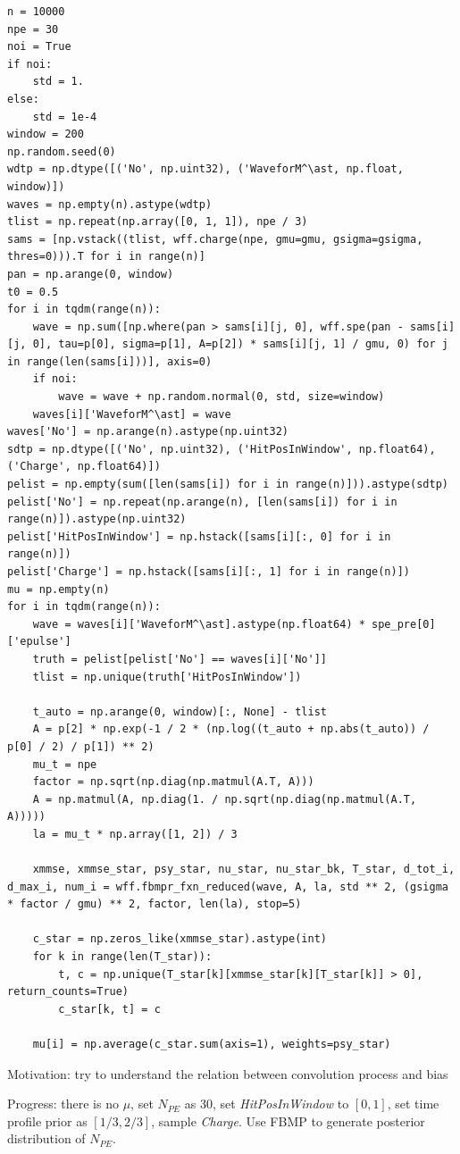 \documentclass[notitlepage]{article}
\begin{document}
\begin{lstlisting}
n = 10000
npe = 30
noi = True
if noi:
    std = 1.
else:
    std = 1e-4
window = 200
np.random.seed(0)
wdtp = np.dtype([('No', np.uint32), ('WaveforM^\ast, np.float, window)])
waves = np.empty(n).astype(wdtp)
tlist = np.repeat(np.array([0, 1, 1]), npe / 3)
sams = [np.vstack((tlist, wff.charge(npe, gmu=gmu, gsigma=gsigma, thres=0))).T for i in range(n)]
pan = np.arange(0, window)
t0 = 0.5
for i in tqdm(range(n)):
    wave = np.sum([np.where(pan > sams[i][j, 0], wff.spe(pan - sams[i][j, 0], tau=p[0], sigma=p[1], A=p[2]) * sams[i][j, 1] / gmu, 0) for j in range(len(sams[i]))], axis=0)
    if noi:
        wave = wave + np.random.normal(0, std, size=window)
    waves[i]['WaveforM^\ast] = wave
waves['No'] = np.arange(n).astype(np.uint32)
sdtp = np.dtype([('No', np.uint32), ('HitPosInWindow', np.float64), ('Charge', np.float64)])
pelist = np.empty(sum([len(sams[i]) for i in range(n)])).astype(sdtp)
pelist['No'] = np.repeat(np.arange(n), [len(sams[i]) for i in range(n)]).astype(np.uint32)
pelist['HitPosInWindow'] = np.hstack([sams[i][:, 0] for i in range(n)])
pelist['Charge'] = np.hstack([sams[i][:, 1] for i in range(n)])
mu = np.empty(n)
for i in tqdm(range(n)):
    wave = waves[i]['WaveforM^\ast].astype(np.float64) * spe_pre[0]['epulse']
    truth = pelist[pelist['No'] == waves[i]['No']]
    tlist = np.unique(truth['HitPosInWindow'])

    t_auto = np.arange(0, window)[:, None] - tlist
    A = p[2] * np.exp(-1 / 2 * (np.log((t_auto + np.abs(t_auto)) / p[0] / 2) / p[1]) ** 2)
    mu_t = npe
    factor = np.sqrt(np.diag(np.matmul(A.T, A)))
    A = np.matmul(A, np.diag(1. / np.sqrt(np.diag(np.matmul(A.T, A)))))
    la = mu_t * np.array([1, 2]) / 3
    
    xmmse, xmmse_star, psy_star, nu_star, nu_star_bk, T_star, d_tot_i, d_max_i, num_i = wff.fbmpr_fxn_reduced(wave, A, la, std ** 2, (gsigma * factor / gmu) ** 2, factor, len(la), stop=5)
    
    c_star = np.zeros_like(xmmse_star).astype(int)
    for k in range(len(T_star)):
        t, c = np.unique(T_star[k][xmmse_star[k][T_star[k]] > 0], return_counts=True)
        c_star[k, t] = c

    mu[i] = np.average(c_star.sum(axis=1), weights=psy_star)
\end{lstlisting}

Motivation: try to understand the relation between convolution process and bias

Progress: there is no $\mu$, set $N_{PE}$ as 30, set \textit{HitPosInWindow} to $[0, 1]$, set time profile prior as $[1/3, 2/3]$, sample \textit{Charge}. Use FBMP to generate posterior distribution of $N_{PE}$. 
\end{document}
